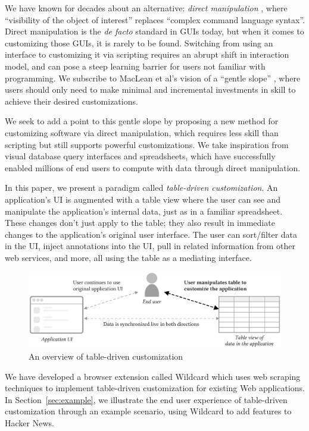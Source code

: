 \documentclass[sigplan,screen,10pt,anonymous,review]{acmart}
\begin{document}
We have known for decades about an alternative: \emph{direct
manipulation} \citep{shneiderman1983}, where ``visibility of the object
of interest'' replaces ``complex command language syntax''. Direct
manipulation is the \emph{de facto} standard in GUIs today, but when it
comes to customizing those GUIs, it is rarely to be found. Switching
from using an interface to customizing it via scripting requires an
abrupt shift in interaction model, and can pose a steep learning barrier
for users not familiar with programming. We subscribe to MacLean et al's
vision of a ``gentle slope'' \citep{maclean1990}, where users should
only need to make minimal and incremental investments in skill to
achieve their desired customizations.

We seek to add a point to this gentle slope by proposing a new method
for customizing software via direct manipulation, which requires less
skill than scripting but still supports powerful customizations. We take
inspiration from visual database query interfaces and spreadsheets,
which have successfully enabled millions of end users to compute with
data through direct manipulation.

In this paper, we present a paradigm called \emph{table-driven
customization}. An application's UI is augmented with a table view where
the user can see and manipulate the application's internal data, just as
in a familiar spreadsheet. These changes don't just apply to the table;
they also result in immediate changes to the application's original user
interface. The user can sort/filter data in the UI, inject annotations
into the UI, pull in related information from other web services, and
more, all using the table as a mediating interface.

\begin{figure}
\hypertarget{fig:overview}{%
\centering
\includegraphics[width=\textwidth]{media/overview.eps}
\caption{An overview of table-driven customization}\label{fig:overview}
}
\end{figure}

We have developed a browser extension called Wildcard which uses web
scraping techniques to implement table-driven customization for existing
Web applications. In Section~\ref{sec:example}, we illustrate the end
user experience of table-driven customization through an example
scenario, using Wildcard to add features to Hacker News.
\end{document}
